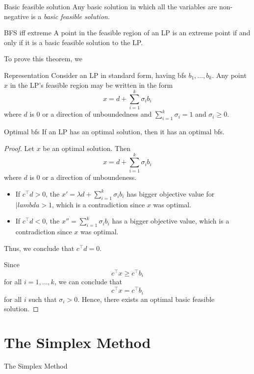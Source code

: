 \begin{definition}{Basic feasible solution}{}
Any basic solution in which all the variables are non-negative is a \emph{basic feasible solution}.
\end{definition}

\begin{theorem}{BFS iff extreme}{}
A point in the feasible region of an LP is an extreme point if and only if it is a basic feasible solution to the LP.
\end{theorem}

To prove this theorem, we 

\begin{theorem}{Representation}{}
Consider an LP in standard form, having bfs $b_1, \dots, b_k$.  Any point $x$ in the LP's feasible region may be written in the form 
$$
x = d + \sum_{i=1}^k \sigma_i b_i
$$
where $d$ is $0$ or a direction of unboundedness and $\sum_{i=1}^k \sigma_i = 1$ and $\sigma_i \geq 0$.
\end{theorem}

\begin{theorem}{Optimal bfs}{}
If an LP has an optimal solution, then it has an optimal bfs.
\end{theorem}

\begin{proof}
Let $x$ be an optimal solution.  Then 
$$
x = d + \sum_{i=1}^k \sigma_i b_i
$$
where $d$ is 0 or a direction of unboundeness.  

\begin{itemize}
\item If $c^\top d > 0$, the $x'  = \lambda d + \sum_{i=1}^k \sigma_i b_i$ has bigger objective value for $|lambda > 1$, which is a contradiction since $x$ was optimal. 
\item If $c^\top d < 0$, the $x'' =\sum_{i=1}^k \sigma_i b_i$ has a bigger objective value, which is a contradiction since $x$ was optimal.
\end{itemize}
Thus, we conclude that $c^\top d = 0$.

Since $$c^\top x \geq c^\top b_i$$ for all $i=1, \dots, k$, we can conclude that 
$$
c^\top x = c^\top b_i
$$
for all $i$ such that $\sigma_i > 0$.   Hence, there exists an optimal basic feasible solution.
\end{proof}


\section{The Simplex Method} {The Simplex Method}
\label{lab:Simplex}


